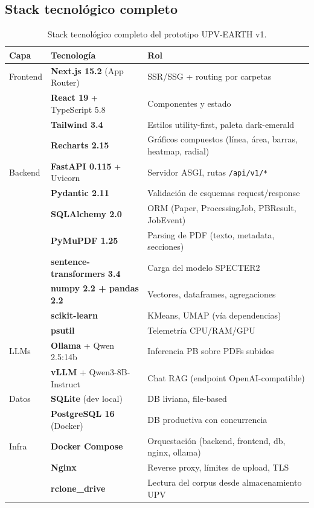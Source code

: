 \documentclass[11pt,a4paper]{article}
\newcommand{\tech}[1]{\textbf{\textcolor{accent}{#1}}}
\begin{document}
\subsection{Stack tecnológico completo}

\begin{table}[h]
\centering\small
\begin{tabularx}{\linewidth}{l l X}
\toprule
\textbf{Capa} & \textbf{Tecnología} & \textbf{Rol} \\
\midrule
Frontend & \tech{Next.js 15.2} (App Router) & SSR/SSG + routing por carpetas \\
& \tech{React 19} + TypeScript 5.8 & Componentes y estado \\
& \tech{Tailwind 3.4} & Estilos utility-first, paleta dark-emerald \\
& \tech{Recharts 2.15} & Gráficos compuestos (línea, área, barras, heatmap, radial) \\
\midrule
Backend & \tech{FastAPI 0.115} + Uvicorn & Servidor ASGI, rutas \texttt{/api/v1/*} \\
& \tech{Pydantic 2.11} & Validación de esquemas request/response \\
& \tech{SQLAlchemy 2.0} & ORM (Paper, ProcessingJob, PBResult, JobEvent) \\
& \tech{PyMuPDF 1.25} & Parsing de PDF (texto, metadata, secciones) \\
& \tech{sentence-transformers 3.4} & Carga del modelo SPECTER2 \\
& \tech{numpy 2.2 + pandas 2.2} & Vectores, dataframes, agregaciones \\
& \tech{scikit-learn} & KMeans, UMAP (vía dependencias) \\
& \tech{psutil} & Telemetría CPU/RAM/GPU \\
\midrule
LLMs & \tech{Ollama} + Qwen 2.5:14b & Inferencia PB sobre PDFs subidos \\
& \tech{vLLM} + Qwen3-8B-Instruct & Chat RAG (endpoint OpenAI-compatible) \\
\midrule
Datos & \tech{SQLite} (dev local) & DB liviana, file-based \\
& \tech{PostgreSQL 16} (Docker) & DB productiva con concurrencia \\
\midrule
Infra & \tech{Docker Compose} & Orquestación (backend, frontend, db, nginx, ollama) \\
& \tech{Nginx} & Reverse proxy, límites de upload, TLS \\
& \tech{rclone\_drive} & Lectura del corpus desde almacenamiento UPV \\
\bottomrule
\end{tabularx}
\caption{Stack tecnológico completo del prototipo UPV-EARTH v1.}
\end{table}
\end{document}
